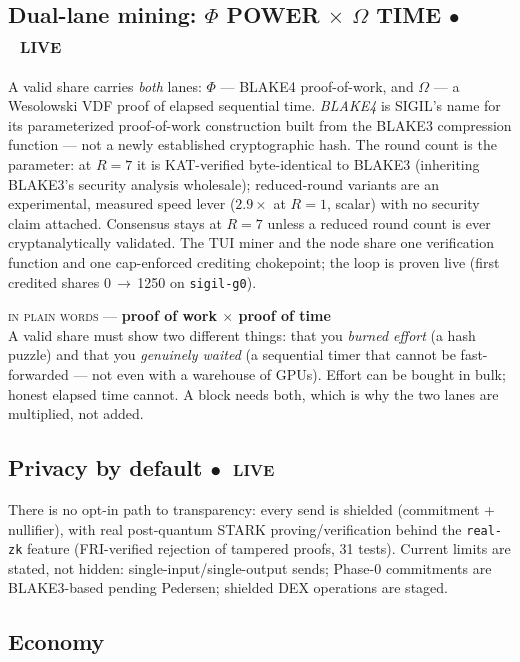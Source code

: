 \documentclass[10pt,a4paper]{article}
\newcommand{\stL}{\textcolor{sigilcyan}{$\bullet$}~{\scriptsize\textcolor{sigilcyan}{\textsc{live}}}}
\newcommand{\layman}[3]{%
\begin{tcolorbox}[enhanced,
  interior style={left color=#1!9,right color=white},
  colframe=#1!45!slate,boxrule=0.5pt,arc=3pt,
  borderline west={2.5pt}{0pt}{#1},
  left=9pt,right=9pt,top=7pt,bottom=7pt]
{\scriptsize\textcolor{#1}{\textsc{in plain words}}\; — \;\textbf{\small #2}}\\[3pt]
\small #3
\end{tcolorbox}}
\begin{document}
\subsection{Dual-lane mining: $\Phi$ POWER $\times$ $\Omega$ TIME \hfill \stL}
\label{sec:mining}

A valid share carries \emph{both} lanes: $\Phi$ — BLAKE4 proof-of-work, and $\Omega$ —
a Wesolowski VDF proof of elapsed sequential time. \emph{BLAKE4} is SIGIL's name for
its parameterized proof-of-work construction built from the BLAKE3 compression function
— not a newly established cryptographic hash. The round count is the parameter: at
$R=7$ it is KAT-verified byte-identical to BLAKE3 (inheriting BLAKE3's security
analysis wholesale); reduced-round variants are an experimental, measured speed lever
($2.9\times$ at $R=1$, scalar) with no security claim attached. Consensus stays at
$R=7$ unless a reduced round count is ever cryptanalytically validated. The TUI miner
and the node share one verification function and one cap-enforced crediting chokepoint;
the loop is proven live (first credited shares 0\,$\to$\,1250 on \texttt{sigil-g0}).

\layman{sigilcyan}{proof of work $\times$ proof of time}{A valid share must show two
different things: that you \emph{burned effort} (a hash puzzle) and that you
\emph{genuinely waited} (a sequential timer that cannot be fast-forwarded — not even
with a warehouse of GPUs). Effort can be bought in bulk; honest elapsed time cannot.
A block needs both, which is why the two lanes are multiplied, not added.}

\subsection{Privacy by default \hfill \stL}

There is no opt-in path to transparency: every send is shielded (commitment +
nullifier), with real post-quantum STARK proving/verification behind the
\texttt{real-zk} feature (FRI-verified rejection of tampered proofs, 31 tests). Current
limits are stated, not hidden: single-input/single-output sends; Phase-0 commitments
are BLAKE3-based pending Pedersen; shielded DEX operations are
\textcolor{sigilviolet}{staged}.

\subsection{Economy}
\end{document}
